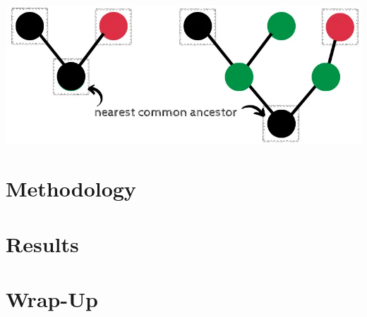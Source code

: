\documentclass[aspectratio=169, usenames, dvipsnames]{beamer}
\begin{document}
\begin{frame}
\begin{center}
\includegraphics[scale=1]{images/tree_expl_4}
\end{center}
\end{frame}

\section{Methodology}

\section{Results}

\section{Wrap-Up}

{
    \begin{frame}[plain]
    \end{frame}
}
\end{document}
